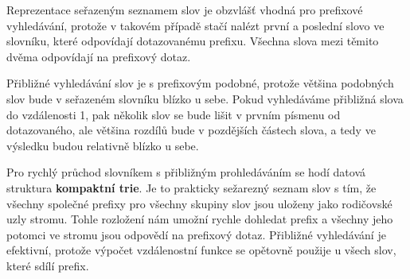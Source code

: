 \documentclass[11pt]{article}
\begin{document}
Reprezentace seřazeným seznamem slov je obzvlášť vhodná pro prefixové
vyhledávání, protože v takovém případě stačí nalézt první a poslední slovo ve
slovníku, které odpovídají dotazovanému prefixu. Všechna slova mezi těmito
dvěma odpovídají na prefixový dotaz.

Přibližné vyhledávání slov je s prefixovým podobné, protože většina podobných
slov bude v seřazeném slovníku blízko u sebe. Pokud vyhledáváme přibližná slova
do vzdálenosti 1, pak několik slov se bude lišit v prvním písmenu od
dotazovaného, ale většina rozdílů bude v pozdějších částech slova, a tedy ve
výsledku budou relativně blízko u sebe.

Pro rychlý průchod slovníkem s přibližným prohledáváním se hodí datová
struktura \textbf{kompaktní trie}. Je to prakticky sežarezný seznam slov s tím,
že všechny společné prefixy pro všechny skupiny slov jsou uloženy jako
rodičovské uzly stromu. Tohle rozložení nám umožní rychle dohledat prefix a
všechny jeho potomci ve stromu jsou odpovědí na prefixový dotaz. Přibližné
vyhledávání je efektivní, protože výpočet vzdálenostní funkce se opětovně
použije u všech slov, které sdílí prefix.
\end{document}
